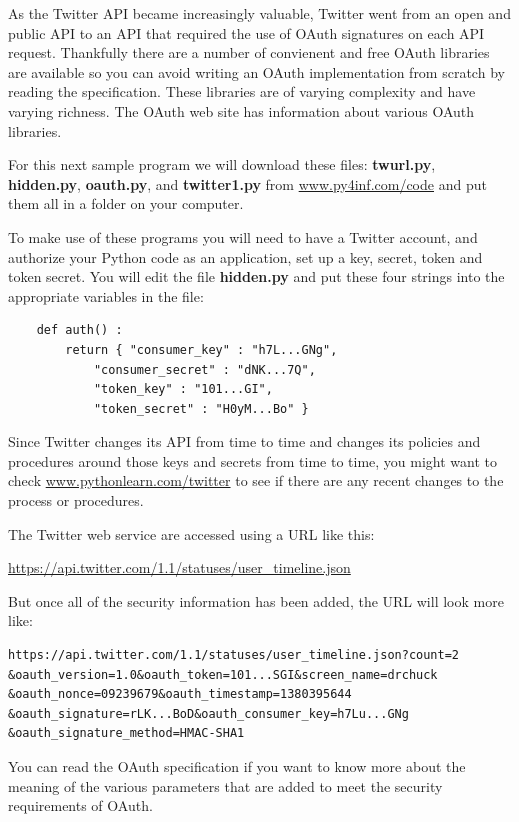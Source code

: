 \documentclass[11pt]{book}
\begin{document}
As the Twitter API became increasingly valuable, Twitter
went from an open and public API to an API that required
the use of OAuth signatures on each API request. Thankfully
there are a number of convienent and free OAuth libraries
are available 
so you can avoid writing an OAuth implementation from scratch
by reading the specification.  These libraries are of 
varying complexity and have varying 
richness.  The OAuth web site has information about various 
OAuth libraries.

For this next sample program we will download these files: 
{\bf twurl.py}, {\bf hidden.py}, 
{\bf oauth.py}, 
and
{\bf twitter1.py} from 
\url{www.py4inf.com/code} and put them all in a folder
on your computer.

To make use of these programs you will need to have a Twitter
account, and authorize your Python code as an application,
set up a key, secret, token and token secret.  You will edit
the file {\bf hidden.py} and put these four strings into the
appropriate variables in the file:

\beforeverb
\begin{verbatim}
    def auth() :
        return { "consumer_key" : "h7L...GNg",
            "consumer_secret" : "dNK...7Q",
            "token_key" : "101...GI",
            "token_secret" : "H0yM...Bo" }
\end{verbatim}
\afterverb
%
Since Twitter changes its API from time to time and changes
its policies and procedures around those keys and secrets
from time to time, you might want to check
\url{www.pythonlearn.com/twitter}
to see if there are any recent changes to the process 
or procedures.

The Twitter web service are accessed using a URL like this:

\url{https://api.twitter.com/1.1/statuses/user_timeline.json}

But once all of the security information has been added, the URL
will look more like:

\beforeverb
\begin{verbatim}
https://api.twitter.com/1.1/statuses/user_timeline.json?count=2
&oauth_version=1.0&oauth_token=101...SGI&screen_name=drchuck
&oauth_nonce=09239679&oauth_timestamp=1380395644
&oauth_signature=rLK...BoD&oauth_consumer_key=h7Lu...GNg
&oauth_signature_method=HMAC-SHA1
\end{verbatim}
\afterverb
%
You can read the OAuth specification if you want to
know more about the meaning of the various parameters that
are added to meet the security requirements of OAuth.  
\end{document}
